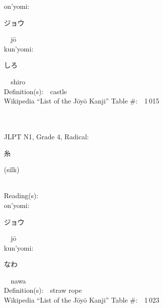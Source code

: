 \begin{multicols}{2}
{\hspace*{1em}}on'yomi:\ \ \\
{\hspace*{2em}}{\begin{CJK}{UTF8}{min} ジョウ \end{CJK}}\ \ j\=o\ \ \\
{\hspace*{1em}}kun'yomi:\ \ \\
{\hspace*{2em}}{\begin{CJK}{UTF8}{min} しろ \end{CJK}}\ \ shiro\ \ \\
Definition(s):\ \ castle \\
Wikipedia ``List of the J\=oy\=o Kanji'' Table \#:\ \ 1\,015 \\
\ \ \\
{\fontsize{34pt}{40pt}  }\ \ \\  %
{JLPT N1, Grade 4, Radical:\ \ {\begin{CJK}{UTF8}{min} 糸 \end{CJK}} (silk) } \\
Reading(s):\ \ \\
{\hspace*{1em}}on'yomi:\ \ \\
{\hspace*{2em}}{\begin{CJK}{UTF8}{min} ジョウ \end{CJK}}\ \ j\=o\ \ \\
{\hspace*{1em}}kun'yomi:\ \ \\
{\hspace*{2em}}{\begin{CJK}{UTF8}{min} なわ \end{CJK}}\ \ nawa\ \ \\
Definition(s):\ \ straw rope \\
Wikipedia ``List of the J\=oy\=o Kanji'' Table \#:\ \ 1\,023 \\
\ \ \\
{\fontsize{34pt}{40pt}  }\ \ \\  %

\end{multicols}
